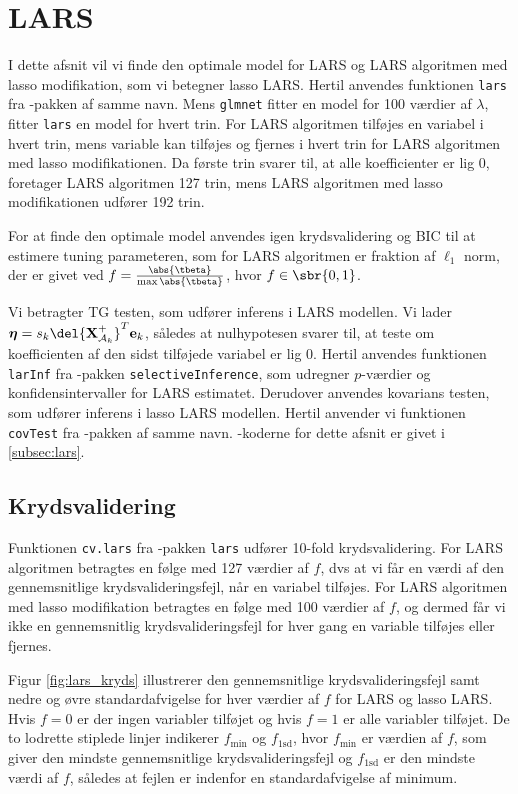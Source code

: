 \section{LARS}
I dette afsnit vil vi finde den optimale model for LARS og LARS algoritmen med lasso modifikation, som vi betegner lasso LARS. 
Hertil anvendes funktionen \texttt{lars} fra \Rlang-pakken af samme navn.
Mens \texttt{glmnet} fitter en model for 100 værdier af \(\lambda\), fitter \texttt{lars} en model for hvert trin.
For LARS algoritmen tilføjes en variabel i hvert trin, mens variable kan tilføjes og fjernes i hvert trin for LARS algoritmen med lasso modifikationen.
Da første trin svarer til, at alle koefficienter er lig 0, foretager LARS algoritmen 127 trin, mens LARS algoritmen med lasso modifikationen udfører 192 trin.

For at finde den optimale model anvendes igen krydsvalidering og BIC til at estimere tuning parameteren, som for LARS algoritmen er fraktion af \(\ell_1\) norm, der er givet ved \(f = \frac{\abs{\tbeta}}{\max \abs{\tbeta}}\), hvor \(f \in \sbr{0,1}\).

Vi betragter TG testen, som udfører inferens i LARS modellen.
Vi lader $\boldsymbol{\eta} = s_k \del{\textbf{X}^+_{\mathcal{A}_k}}^T \mathbf{e}_k$, således at nulhypotesen svarer til, at teste om koefficienten af den sidst tilføjede variabel er lig 0.
Hertil anvendes funktionen \texttt{larInf} fra \Rlang-pakken \texttt{selectiveInference}, som udregner \(p\)-værdier og konfidensintervaller for LARS estimatet.
Derudover anvendes kovarians testen, som udfører inferens i lasso LARS modellen.
Hertil anvender vi funktionen \texttt{covTest} fra \Rlang-pakken af samme navn. 
\Rlang-koderne for dette afsnit er givet i \ref{subsec:lars}.

\subsection{Krydsvalidering}
Funktionen \texttt{cv.lars} fra \Rlang-pakken \texttt{lars} udfører 10-fold krydsvalidering.
For LARS algoritmen betragtes en følge med 127 værdier af $f$, dvs at vi får en værdi af den gennemsnitlige krydsvalideringsfejl, når en variabel tilføjes.
For LARS algoritmen med lasso modifikation betragtes en følge med 100 værdier af $f$, og dermed får vi ikke en gennemsnitlig krydsvalideringsfejl for hver gang en variable tilføjes eller fjernes.

Figur \ref{fig:lars_kryds} illustrerer den gennemsnitlige krydsvalideringsfejl samt nedre og øvre standardafvigelse for hver værdier af $f$ for LARS og lasso LARS.
Hvis $f = 0$ er der ingen variabler tilføjet og hvis $f=1$ er alle variabler tilføjet. 
De to lodrette stiplede linjer indikerer \(f_{\text{min}}\) og \(f_\text{1sd}\), hvor \(f_{\text{min}}\) er værdien af \(f\), som giver den mindste gennemsnitlige krydsvalideringsfejl og \(f_\text{1sd}\) er den mindste værdi af \(f\), således at fejlen er indenfor en standardafvigelse af minimum. 

